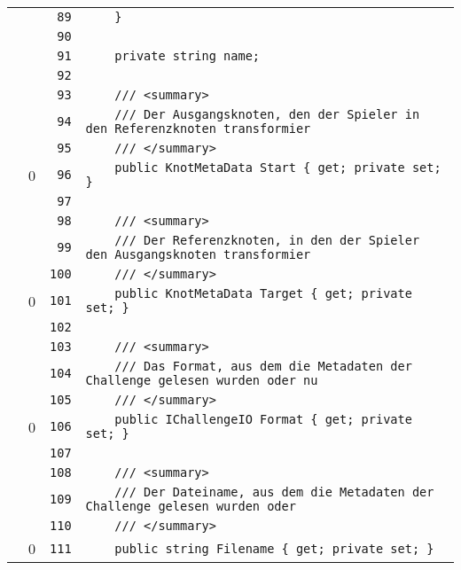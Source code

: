 \documentclass[a4paper,10pt]{article}
\begin{document}
\begin{longtable}[l]{lrrl}
\cellcolor{gray} &  & \verb~89~ & \verb~    }~\\
\cellcolor{gray} &  & \verb~90~ & \verb~~\\
\cellcolor{gray} &  & \verb~91~ & \verb~    private string name;~\\
\cellcolor{gray} &  & \verb~92~ & \verb~~\\
\cellcolor{gray} &  & \verb~93~ & \verb~    /// <summary>~\\
\cellcolor{gray} &  & \verb~94~ & \verb~    /// Der Ausgangsknoten, den der Spieler in den Referenzknoten transformier~\\
\cellcolor{gray} &  & \verb~95~ & \verb~    /// </summary>~\\
\cellcolor{red} & 0 & \verb~96~ & \verb~    public KnotMetaData Start { get; private set; }~\\
\cellcolor{gray} &  & \verb~97~ & \verb~~\\
\cellcolor{gray} &  & \verb~98~ & \verb~    /// <summary>~\\
\cellcolor{gray} &  & \verb~99~ & \verb~    /// Der Referenzknoten, in den der Spieler den Ausgangsknoten transformier~\\
\cellcolor{gray} &  & \verb~100~ & \verb~    /// </summary>~\\
\cellcolor{red} & 0 & \verb~101~ & \verb~    public KnotMetaData Target { get; private set; }~\\
\cellcolor{gray} &  & \verb~102~ & \verb~~\\
\cellcolor{gray} &  & \verb~103~ & \verb~    /// <summary>~\\
\cellcolor{gray} &  & \verb~104~ & \verb~    /// Das Format, aus dem die Metadaten der Challenge gelesen wurden oder nu~\\
\cellcolor{gray} &  & \verb~105~ & \verb~    /// </summary>~\\
\cellcolor{red} & 0 & \verb~106~ & \verb~    public IChallengeIO Format { get; private set; }~\\
\cellcolor{gray} &  & \verb~107~ & \verb~~\\
\cellcolor{gray} &  & \verb~108~ & \verb~    /// <summary>~\\
\cellcolor{gray} &  & \verb~109~ & \verb~    /// Der Dateiname, aus dem die Metadaten der Challenge gelesen wurden oder~\\
\cellcolor{gray} &  & \verb~110~ & \verb~    /// </summary>~\\
\cellcolor{red} & 0 & \verb~111~ & \verb~    public string Filename { get; private set; }~\\

\end{longtable}
\end{document}
